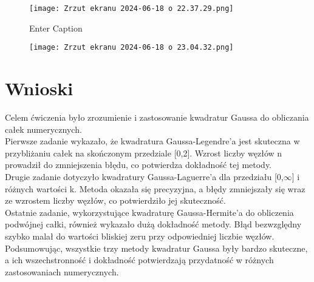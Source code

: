 \documentclass{article}
\begin{document}
\begin{figure}[H]
    \centering
    \texttt{[image: Zrzut ekranu 2024-06-18 o 22.37.29.png]}
    \caption*{Enter Caption}
    \label{fig:enter-label}
\end{figure}

\begin{figure}[H]
    \centering
    \texttt{[image: Zrzut ekranu 2024-06-18 o 23.04.32.png]}
    \caption*{}
    \label{fig:enter-label}
\end{figure}

\section{Wnioski}
Celem ćwiczenia było zrozumienie i zastosowanie kwadratur Gaussa do obliczania całek numerycznych.\\
\noindent
Pierwsze zadanie wykazało, że kwadratura Gaussa-Legendre'a jest skuteczna w przybliżaniu całek na skończonym przedziale 
[0,2]. Wzrost liczby węzłów 
n prowadził do zmniejszenia błędu, co potwierdza dokładność tej metody.\\
\noindent
Drugie zadanie dotyczyło kwadratury Gaussa-Laguerre'a dla przedziału 
[0,$\infty$] i różnych wartości 
k. Metoda okazała się precyzyjna, a błędy zmniejszały się wraz ze wzrostem liczby węzłów, co potwierdziło jej skuteczność. \\
\noindent
Ostatnie zadanie, wykorzystujące kwadraturę Gaussa-Hermite'a do obliczenia podwójnej całki, również wykazało dużą dokładność metody. Błąd bezwzględny szybko malał do wartości bliskiej zeru przy odpowiedniej liczbie węzłów. \\
\noindent
Podsumowując, wszystkie trzy metody kwadratur Gaussa były bardzo skuteczne, a ich wszechstronność i dokładność potwierdzają przydatność w różnych zastosowaniach numerycznych.
\end{document}

